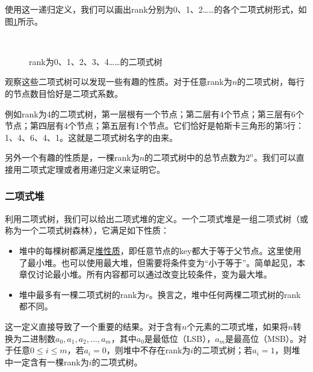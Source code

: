\documentclass[UTF8]{article}
\begin{document}
使用这一递归定义，我们可以画出rank分别为0、1、2……的各个二项式树形式，如图\ref{fig:bitree-forms}所示。

\begin{figure}[htbp]
  \centering
   \\
  \caption{rank为0、1、2、3、4……的二项式树} \label{fig:bitree-forms}
\end{figure}

观察这些二项式树可以发现一些有趣的性质。对于任意rank为$n$的二项式树，每行的节点数目恰好是二项式系数。

例如rank为4的二项式树，第一层根有一个节点；第二层有4个节点；第三层有6个节点；第四层有4个节点；第五层有1个节点。它们恰好是帕斯卡三角形的第5行：1、4、6、4、1。这就是二项式树名字的由来。

另外一个有趣的性质是，一棵rank为$n$的二项式树中的总节点数为$2^n$。我们可以直接用二项式定理或者用递归定义来证明它。

\subsubsection{二项式堆}
\label{Binomial heap} 

利用二项式树，我们可以给出二项式堆的定义。一个二项式堆是一组二项式树（或称为一个二项式树森林），它满足如下性质：

\begin{itemize}
\item 堆中的每棵树都满足\underline{堆性质}，即任意节点的key都大于等于父节点。这里使用了最小堆。也可以使用最大堆，但需要将条件变为“小于等于”。简单起见，本章仅讨论最小堆。所有内容都可以通过改变比较条件，变为最大堆。
\item 堆中最多有一棵二项式树的rank为$r$。换言之，堆中任何两棵二项式树的rank都不同。
\end{itemize}

这一定义直接导致了一个重要的结果。对于含有$n$个元素的二项式堆，如果将$n$转换为二进制数$a_0, a_1, a_2, ..., a_m$，其中$a_0$是最低位（LSB），$a_m$是最高位（MSB）。对于任意$0 \leq i \leq m$，若$a_i=0$，则堆中不存在rank为$i$的二项式树；若$a_i = 1$，则堆中一定含有一棵rank为$i$的二项式树。
\end{document}
